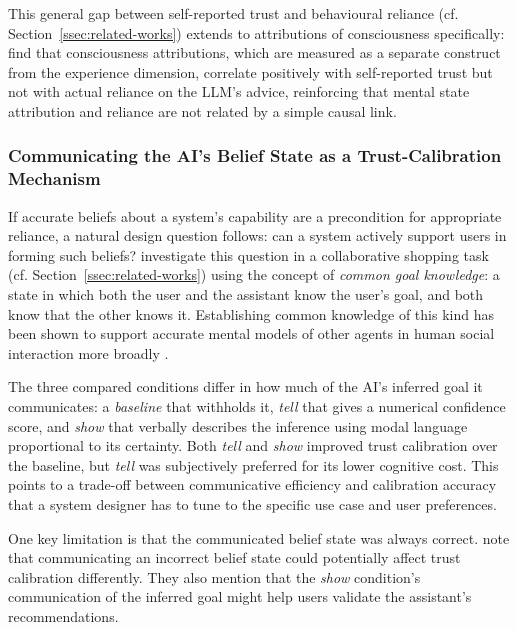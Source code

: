 This general gap between self-reported trust and behavioural reliance (cf. Section~\ref{ssec:related-works}) extends to attributions of consciousness specifically: \textcite{Colombatto2025} find that consciousness attributions, which are measured as a separate construct from the experience dimension, correlate positively with self-reported trust but not with actual reliance on the \ac{LLM}'s advice, reinforcing that mental state attribution and reliance are not related by a simple causal link.

\subsubsection*{Communicating the AI's Belief State as a Trust-Calibration Mechanism}

If accurate beliefs about a system's capability are a precondition for appropriate reliance, a natural design question follows: can a system actively support users in forming such beliefs? \textcite{Ying2024} investigate this question in a collaborative shopping task (cf. Section~\ref{ssec:related-works}) using the concept of \textit{common goal knowledge}: a state in which both the user and the assistant know the user's goal, and both know that the other knows it. Establishing common knowledge of this kind has been shown to support accurate mental models of other agents in human social interaction more broadly \parencite{Thomas2014}.

The three compared conditions differ in how much of the \ac{AI}'s inferred goal it communicates: a \textit{baseline} that withholds it, \textit{tell} that gives a numerical confidence score, and \textit{show} that verbally describes the inference using modal language proportional to its certainty. Both \textit{tell} and \textit{show} improved trust calibration over the baseline, but \textit{tell} was subjectively preferred for its lower cognitive cost. This points to a trade-off between communicative efficiency and calibration accuracy that a system designer has to tune to the specific use case and user preferences.

One key limitation is that the communicated belief state was always correct. \textcite{Ying2024} note that communicating an incorrect belief state could potentially affect trust calibration differently. They also mention that the \textit{show} condition's communication of the inferred goal might help users validate the assistant's recommendations.


